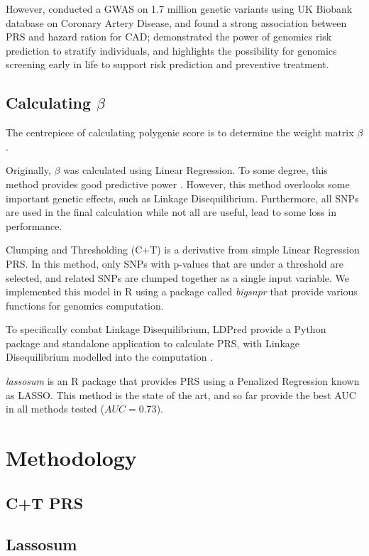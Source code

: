 \documentclass{article}
\begin{document}
However, \cite{Inouye1883} conducted a GWAS on 1.7 million genetic
variants using UK Biobank database on Coronary Artery Disease, and found
a strong association between PRS and hazard ration for CAD; demonstrated
the power of genomics risk prediction to stratify individuals, and highlights the
possibility for genomics screening early in life to support risk prediction and
preventive treatment.

\subsection{Calculating $\beta$}
The centrepiece of calculating polygenic score is to determine the weight matrix $\beta$.

Originally, $\beta$ was calculated using Linear Regression. To some degree, this method
provides good predictive power \cite{Dudbridge2013}. However, this method overlooks some 
important genetic effects, such as Linkage Disequilibrium. Furthermore, all SNPs are 
used in the final calculation while not all are useful, lead to some loss in performance.

Clumping and Thresholding (C+T) is a derivative from simple Linear Regression PRS. 
In this method, only SNPs with p-values that are under a threshold are selected, and 
related SNPs are clumped together as a single input variable. 
We implemented this model in R using a package called \textit{bigsnpr} \cite{bigsnpr} 
that provide various functions for genomics computation.

To specifically combat Linkage Disequilibrium, LDPred provide a Python package and 
standalone application to calculate PRS, with Linkage Disequilibrium modelled into the computation 
\cite{LDpred}.

\textit{lassosum} \cite{doi:10.1002/gepi.22050} is an R package that provides PRS using a 
Penalized Regression known as LASSO. 
This method is the state of the art, and so far provide the best AUC in all methods 
tested ($AUC = 0.73$).

\section{Methodology}

\subsection{C+T PRS}
\subsection{Lassosum}
\end{document}
